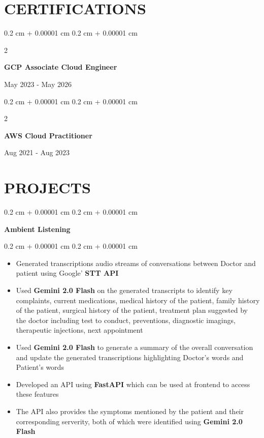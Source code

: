 \documentclass[10pt, letterpaper]{article}
\newenvironment{highlights}{
    \begin{itemize}[
        topsep=0.10 cm,
        parsep=0.10 cm,
        partopsep=0pt,
        itemsep=0pt,
        leftmargin=0.4 cm + 10pt
    ]
}{
    \end{itemize}
} %
\newenvironment{onecolentry}{
    \begin{adjustwidth}{
        0.2 cm + 0.00001 cm
    }{
        0.2 cm + 0.00001 cm
    }
}{
    \end{adjustwidth}
} %
\newenvironment{twocolentry}[2][]{
    \onecolentry
    \def\secondColumn{#2}
    \setcolumnwidth{\fill, 4.5 cm}
    \begin{paracol}{2}
}{
    \switchcolumn \raggedleft \secondColumn
    \end{paracol}
    \endonecolentry
} %
\begin{document}
    \section{CERTIFICATIONS}
        \begin{samepage}
            \begin{twocolentry}{
                May 2023 - May 2026
            }
                \textbf{GCP Associate Cloud Engineer}
                \vspace{0.10 cm}
            \end{twocolentry}
            \begin{twocolentry}{
                Aug 2021 - Aug 2023
            }
                \textbf{AWS Cloud Practitioner}
                \vspace{0.10 cm}
            \end{twocolentry}
        \end{samepage}

    \vspace{0.2 cm}
    
    \section{PROJECTS}
        
        \begin{onecolentry}
            \textbf{Ambient Listening}
        \end{onecolentry}
        \vspace{0.10 cm}
        \begin{onecolentry}
            \begin{highlights}
                \item Generated transcriptions audio streams of conversations between Doctor and patient using Google' \textbf{STT API}
                \item Used \textbf{Gemini 2.0 Flash} on the generated transcripts to identify key complaints, current medications, medical history of the patient, family history of the patient, surgical history of the patient, treatment plan suggested by the doctor including test to conduct, preventions, diagnostic imagings, therapeutic injections, next appointment
                \item Used \textbf{Gemini 2.0 Flash} to generate a summary of the overall conversation and update the generated transcriptions highlighting Doctor's words and Patient's words
                \item Developed an API using \textbf{FastAPI} which can be used at frontend to access these features
                \item The API also provides the symptoms mentioned by the patient and their corresponding serverity, both of which were identified using \textbf{Gemini 2.0 Flash}
            \end{highlights}
        \end{onecolentry}
\end{document}
